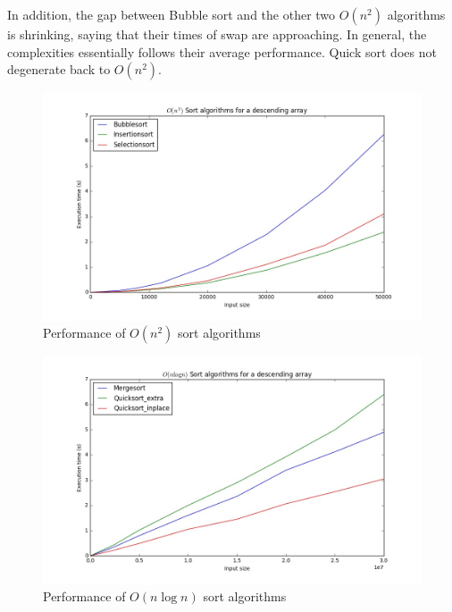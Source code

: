In addition, the gap between Bubble sort and the other two $O(n^2)$ algorithms is shrinking, saying that their times of swap are approaching. In general, the complexities essentially follows their average performance. Quick sort does not degenerate back to $O(n^2)$.
\begin{figure}[H]
    \centering
    \includegraphics[width=0.8\linewidth]{../a1/reverse012}
    \caption{Performance of $O(n^2)$ sort algorithms}\label{r012}
\end{figure}
\begin{figure}[H]
    \centering
    \includegraphics[width=0.8\linewidth]{../a1/reverse345}
    \caption{Performance of $O(n\log n)$ sort algorithms}\label{r345}
\end{figure}

